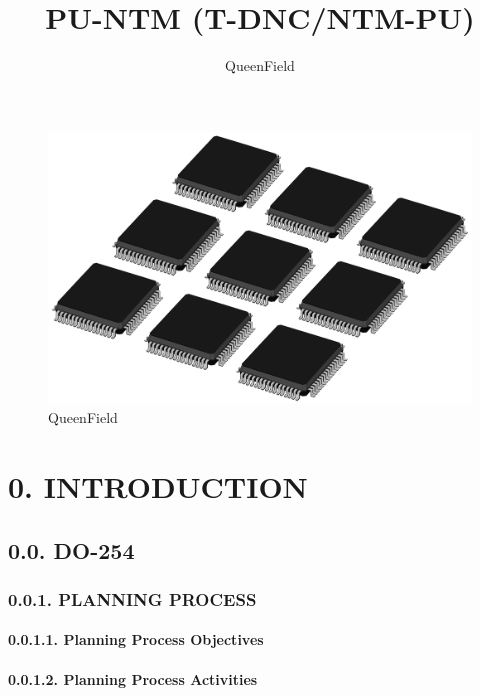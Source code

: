 \documentclass[
]{article}
\title{PU-NTM (T-DNC/NTM-PU)}
\author{QueenField}
\date{}
\begin{document}
\maketitle

\begin{figure}
\centering
\includegraphics{../icon.jpg}
\caption{QueenField}
\end{figure}

\hypertarget{introduction}{%
\section{0. INTRODUCTION}\label{introduction}}

\hypertarget{do-254}{%
\subsection{0.0. DO-254}\label{do-254}}

\hypertarget{planning-process}{%
\subsubsection{0.0.1. PLANNING PROCESS}\label{planning-process}}

\hypertarget{planning-process-objectives}{%
\paragraph{0.0.1.1. Planning Process
Objectives}\label{planning-process-objectives}}

\hypertarget{planning-process-activities}{%
\paragraph{0.0.1.2. Planning Process
Activities}\label{planning-process-activities}}
\end{document}
